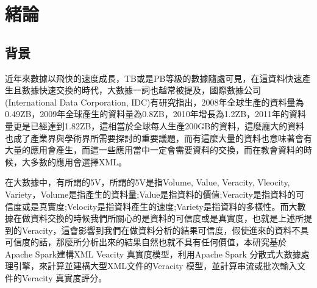 \section{緒論}
\subsection{背景}
近年來數據以飛快的速度成長，TB或是PB等級的數據隨處可見，在這資料快速產生且數據快速交換的時代，大數據一詞也越常被提及，國際數據公司(International Data Corporation, IDC)有研究指出，2008年全球生產的資料量為0.49ZB，2009年全球產生的資料量為0.8ZB，2010年增長為1.2ZB，2011年的資料量更是已經達到1.82ZB，這相當於全球每人生產200GB的資料，這麼龐大的資料也成了產業界與學術界所需要探討的重要議題，而有這麼大量的資料也意味著會有大量的應用會產生，而這一些應用當中一定會需要資料的交換，而在教會資料的時候，大多數的應用會選擇XML。\\\par
在大數據中，有所謂的5V，所謂的5V是指Volume, Value, Veracity, Vleocity, Variety，Volume是指產生的資料量;Value是指資料的價值;Veracity是指資料的可信度或是真實度;Velocity是指資料產生的速度;Variety是指資料的多樣性。而大數據在做資料交換的時候我們所關心的是資料的可信度或是真實度，也就是上述所提到的Veracity，這會影響到我們在做資料分析的結果可信度，假使進來的資料不具可信度的話，那麼所分析出來的結果自然也就不具有任何價值，本研究基於Apache Spark建構XML Veacity 真實度模型，利用Apache Spark 分散式大數據處理引擎，來計算並建構大型XML文件的Veracity 模型，並計算串流或批次輸入文件的Veracity 真實度評分。
